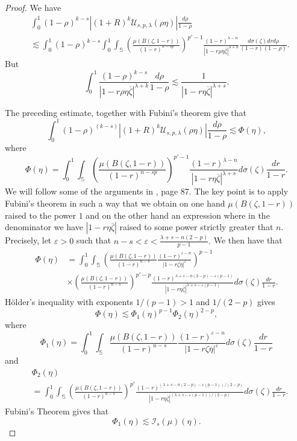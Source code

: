 \documentclass[12pt,twoside,leqno,final]{amsart}
\theoremstyle{plain}
\begin{document}
\begin{proof}
 We have
\begin{equation*}\begin{split}&
\int_0^1 (1-\rho)^{k-s} |(1+R)^k {\mathcal U}_{s,p,\lambda}(\rho\eta)|\frac{d\rho}{1-\rho} 
\\&\lesssim 
\int_0^1 (1-\rho)^{k-s}\int_0^1 \int_{{\mathbb S}} \left(\frac{\mu(B(\zeta, 1-r))}{(1-r)^{n-sp}} \right)^{p'-1} \frac{(1-r)^{\lambda-n}}{|1-r\rho\eta\overline{\zeta}|^{\lambda+k}} \frac{d\sigma(\zeta)drd\rho}{(1-r)(1-\rho)}.
\end{split}\end{equation*}
But
                              $$\int_0^1\frac{(1-\rho)^{k-s}}{|1-r\rho\eta\overline{\zeta}|^{\lambda+k}}\frac{d\rho}{1-\rho} \lesssim \frac1{|1-r\eta\overline{\zeta}|^{\lambda+s}}.$$

The preceding estimate, together with Fubini's theorem give that
$$\int_0^1 (1-\rho)^{(k-s)} |(1+R)^k {\mathcal U}_{s,p,\lambda}(\rho\eta)|\frac{d\rho}{1-\rho}\lesssim \Phi(\eta),$$
where 
$$\Phi(\eta)= \int_0^1\int_{{\mathbb S}} \left(\frac{\mu(B(\zeta, 1-r))}{(1-r)^{n-sp}} \right)^{p'-1} \frac{(1-r)^{\lambda-n}}{|1-r\eta\overline{\zeta}|^{\lambda+s}} d\sigma(\zeta)\frac{dr}{1-r}.$$
We will follow some of the arguments in \cite{cohnverbitsky}, page 87. The key point is to apply Fubini's theorem in such a way that we obtain on one hand $\mu(B(\zeta,1-r))$ raised to the power $1$ and on the other hand an expression where in the denominator we have $|1-r\eta\overline{\zeta}|$ raised to some power strictly greater that $n$.
Precisely, let $\varepsilon>0$ such that $n-s<\varepsilon <\frac{\lambda+s-n(2-p)}{p-1}.$
We then have that
\begin{equation*}\begin{split}\Phi(\eta)&= \int_0^1\int_{{\mathbb S}} \left(\frac{\mu(B(\zeta, 1-r))}{(1-r)^{n-s}}\frac{(1-r)^{\varepsilon-n}}{|1-r\zeta\overline{\eta}|^\varepsilon} \right)^{p-1}\\&
\times
\left(\frac{\mu(B(\zeta, 1-r))}{(1-r)^{n-s}}\right)^{p'-p}\frac{(1-r)^{\lambda+s-n(2-p)-\varepsilon(p-1)}}{|1-r\eta\overline{\zeta}|^{\lambda+s-\varepsilon(p-1)}}d\sigma(\zeta)\frac{dr}{1-r}.
\end{split}\end{equation*}
H\"older's inequality with exponents $1/(p-1)>1$ and $1/(2-p)$ gives
$$\Phi(\eta)\lesssim \Phi_1(\eta)^{p-1} \Phi_2(\eta)^{2-p},$$
where 
$$\Phi_1(\eta)=\int_0^1\int_{{\mathbb S}}\frac{\mu(B(\zeta, 1-r))}{(1-r)^{n-s}}\frac{(1-r)^{\varepsilon-n}}{|1-r\zeta\overline{\eta}|^\varepsilon}d\sigma(\zeta)\frac{dr}{1-r}$$
and
\begin{equation*}\begin{split}&
\Phi_2(\eta)\\&=\int_0^1\int_{{\mathbb S}}\left(\frac{\mu(B(\zeta, 1-r))}{(1-r)^{n-s}}\right)^{p'}
\frac{(1-r)^{(\lambda+s-n(2-p)-\varepsilon(p-1))/(2-p)}}{|1-r\eta\overline{\zeta}|^{(\lambda+s-\varepsilon(p-1))/(2-p)}}d\sigma(\zeta)\frac{dr}{1-r}.\end{split}\end{equation*}
Fubini's Theorem gives that 
$$\Phi_1(\eta)\lesssim \mathcal{I}_s(\mu)(\eta).$$


\end{proof}
\end{document}
